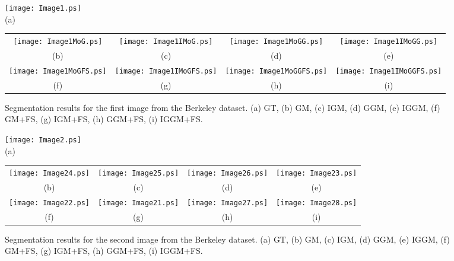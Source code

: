 \documentclass[journal,10pt]{elsart}
\begin{document}
\begin{figure*}
\begin{center}
\texttt{[image: Image1.ps]}\\
(a)
\end{center}
\begin{center}
\begin{tabular}{cccc}
 \texttt{[image: Image1MoG.ps]}
&
\texttt{[image: Image1IMoG.ps]}
&
\texttt{[image: Image1MoGG.ps]}
&
\texttt{[image: Image1IMoGG.ps]}
\\
(b)&(c)&(d)&(e)
\\
 \texttt{[image: Image1MoGFS.ps]}
&
\texttt{[image: Image1IMoGFS.ps]}
&
\texttt{[image: Image1MoGGFS.ps]}
&
\texttt{[image: Image1IMoGGFS.ps]}
\\
(f)&(g)&(h)&(i)
\end{tabular}
\caption{Segmentation results for the first image from the Berkeley dataset. (a) GT, (b) GM, (c) IGM, (d) GGM, (e) IGGM, (f) GM+FS, (g) IGM+FS, (h) GGM+FS, (i) IGGM+FS.} \label{image1}
\end{center}
\end{figure*}
\begin{figure*}
\begin{center}
\texttt{[image: Image2.ps]}\\
(a)
\end{center}
\begin{center}
\begin{tabular}{cccc}
 \texttt{[image: Image24.ps]}
&
\texttt{[image: Image25.ps]}
&
\texttt{[image: Image26.ps]}
&
\texttt{[image: Image23.ps]}
\\
(b)&(c)&(d)&(e)
\\
 \texttt{[image: Image22.ps]}
&
\texttt{[image: Image21.ps]}
&
\texttt{[image: Image27.ps]}
&
\texttt{[image: Image28.ps]}
\\
(f)&(g)&(h)&(i)
\end{tabular}
\caption{Segmentation results for the second image from the Berkeley dataset. (a) GT, (b) GM, (c) IGM, (d) GGM, (e) IGGM, (f) GM+FS, (g) IGM+FS, (h) GGM+FS, (i) IGGM+FS.}
\label{image2}
\end{center}
\end{figure*}
\end{document}
